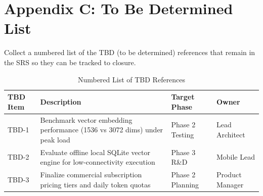 \documentclass[11pt,a4paper]{article}
\begin{document}
\section*{Appendix C: To Be Determined List}
Collect a numbered list of the TBD (to be determined) references that remain in the SRS so they can be tracked to closure.

\begin{table}[h!]
\centering
\small
\begin{tabularx}{\textwidth}{|>{\raggedright\arraybackslash}p{2.0cm}|>{\raggedright\arraybackslash}X|>{\raggedright\arraybackslash}p{3.0cm}|>{\raggedright\arraybackslash}p{3.0cm}|}
\hline
\textbf{TBD Item} & \textbf{Description} & \textbf{Target Phase} & \textbf{Owner} \\ \hline
TBD-1 & Benchmark vector embedding performance (1536 vs 3072 dims) under peak load & Phase 2 Testing & Lead Architect \\ \hline
TBD-2 & Evaluate offline local SQLite vector engine for low-connectivity execution & Phase 3 R\&D & Mobile Lead \\ \hline
TBD-3 & Finalize commercial subscription pricing tiers and daily token quotas & Phase 2 Planning & Product Manager \\ \hline
\end{tabularx}
\caption{Numbered List of TBD References}
\end{table}
\end{document}
